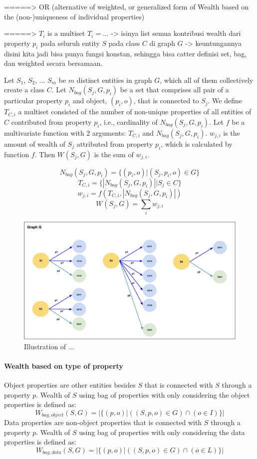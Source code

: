 \documentclass[
]{ceurart}
\begin{document}
=====> OR (alternative of weighted, or generalized form of Wealth based on the (non-)uniqueness of individual properties)

=====> \(T_i\) is a multiset \(T_i = ... \) -> isinya list semua kontribusi wealth dari property \(p_i\) pada seluruh entity \(S\) pada class \(C\) di graph \(G\) -> keuntungannya disini kita jadi bisa punya fungsi konstan, sehingga bisa catter definisi set, bag, dan weighted secara bersamaan.

Let \(S_1\), \(S_2\), ... \(S_m\) be \(m\) distinct entities in graph \(G\), which all of them collectively create a class \(C\). Let \(N_{bag}(S_j,G,p_i)\) be a set that comprises all pair of a particular property \(p_i\) and object, \((p_i,o)\), that is connected to \(S_j\). We define \(T_{C,i}\) a multiset consisted of the number of non-unique properties of all entities of \(C\) contributed from property \(p_i\), i.e., cardinality of \(N_{bag}(S_j,G,p_i)\). Let \(f\) be a multivariate function with 2 arguments: \(T_{C,i}\) and \(N_{bag}(S_j,G,p_i)\). \(w_{j,i}\) is the amount of wealth of \(S_j\) attributed from property \(p_i\), which is calculated by function \(f\). Then \(W_{}(S_j, G)\) is the sum of \(w_{j,i}\).


\[
    N_{bag}(S_j,G,p_i) = \{(p_i,o) | (S_j, p_i, o) ∈ G\}
\]
\[
    T_{C,i} = \{|N_{bag}(S_j,G,p_i)| | S_j ∈ C\}
\]
\[
    w_{j,i} = f(T_{C,i}, |N_{bag}(S_j,G,p_i)|)
\]
\[
    W_{}(S_j, G) = \sum_i w_{j,i}
\]

\begin{figure}
    \centering
    \includegraphics[scale=.3]{Wealth Weighted}
    \caption{Illustration of ...}
    \label{fig:wealth-weighted}
\end{figure}

\paragraph{Wealth based on type of property}
Object properties are other entities besides \(S\) that is connected with \(S\) through a property \(p\). Wealth of \(S\) using bag of properties with only considering the object properties is defined as:
\[
    W_{bag, object}(S, G) = |\{(p,o) | ((S, p, o) ∈ G) \cap (o ∈ I)\}|
\]
Data properties are non-object properties that is connected with \(S\) through a property \(p\). Wealth of \(S\) using bag of properties with only considering the data properties is defined as:
\[
    W_{bag, data}(S, G) = |\{(p,o) | ((S, p, o) ∈ G) \cap (o ∈ L)\}|
\]
\end{document}
